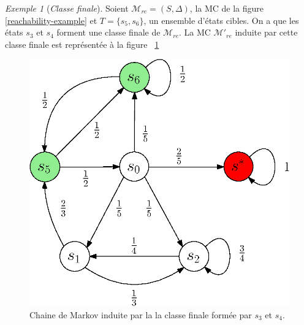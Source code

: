 \documentclass[12pt,a4paper]{report}
\theoremstyle{definition}%
\theoremstyle{remark}
\newtheorem{example}{Exemple}[chapter]
\begin{document}
\begin{example}[\textit{Classe finale}]
	Soient $\mathcal{M}_{re} = (S, \Delta)$, la MC de la figure \ref{reachability-example} et $T = \{s_5, s_6\}$, un ensemble d'états cibles. On a que les états $s_3$ et $s_4$ forment une classe finale de $\mathcal{M}_{re}$. La MC $\mathcal{M'}_{re}$ induite par cette classe finale est représentée à la figure ~\ref{absorbing-chain}
		\begin{figure}[H]
		\centering
		\includegraphics[scale=0.7]{figures/absorbing-chain.eps}
		\caption{Chaine de Markov induite par la la classe finale formée par $s_3$ et $s_4$.}
		\label{absorbing-chain}
	\end{figure}
\end{example}
\end{document}
